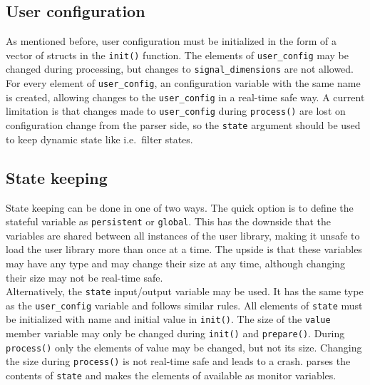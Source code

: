 \documentclass[11pt,a4paper,twoside]{article}
\newcommand{\+}{\discretionary{\mbox{\scriptsize$\hookleftarrow$}}{}{}}
\begin{document}
\subsection{User configuration}
As mentioned before, user configuration must be initialized in the form of a
vector of structs in the \texttt{init()} function.
The elements of \texttt{user\_config} may be changed during processing,
but changes to \texttt{signal\_dimensions} are not allowed. 
For every element of \texttt{user\_config}, an \mha{} configuration variable
with the same name is created, allowing changes to the \texttt{user\_config} in
a real-time safe way.
A current limitation is that changes made to \texttt{user\_config} during \texttt{process()} are
lost on configuration change from the parser side, so the \texttt{state}
argument should be used to keep dynamic state like i.e.\ filter states.
\subsection{State keeping}
State keeping can be done in one of two ways. The quick option is to define the
stateful variable as \texttt{persistent} or \texttt{global}. This has the
downside that the variables are shared between all instances of the user
library, making it unsafe to load the user library more than once at a time.
The upside is that these variables may have any type and may change their size
at any time, although changing their size may not be real-time safe. \\
Alternatively, the \texttt{state} input/output variable may be used.
It has the same type as the \texttt{user\_config} variable and follows similar rules.
All elements of \texttt{state} must be initialized with name and initial value
in \texttt{init()}. The size of the \texttt{value} member variable may only be changed
during \texttt{init()} and \texttt{prepare()}. During \texttt{process()} only
the elements of value may be changed, but not its size. Changing the size during
\texttt{process()} is not real-time safe and leads to a crash. \mha{} parses the
contents of \texttt{state} and makes the elements of available as monitor variables.
\end{document}
